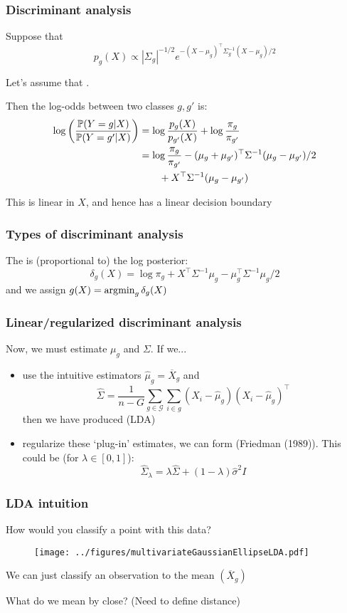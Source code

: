 \documentclass[12pt]{beamer}
\begin{document}
\begin{frame}
\frametitle{Discriminant analysis}
Suppose that
\[
p_g(X) \propto |\Sigma_g|^{-1/2} e^{-(X - \mu_g)^{\top}\Sigma_g^{-1}(X - \mu_g)/2}
\]

Let's assume that . 
\vsp

Then the log-odds between two classes $g,g'$ is:
\begin{align*}
\log\left( \frac{\P(Y = g | X)}{\P(Y = g' | X) } \right)
&  = 
\log\frac{p_g(X)}{p_{g'}(X)} + \log \frac{\pi_g}{\pi_{g'}}\\
& = 
\log \frac{\pi_g}{\pi_{g'}} - (\mu_{g} + \mu_{g'})^{\top} \Sigma^{-1} (\mu_g - \mu_{g'})/2  \\
& \qquad+ X^{\top} \Sigma^{-1}(\mu_g - \mu_{g'})
\end{align*}

This is linear in $X$, and hence has a linear decision boundary
\end{frame}

\begin{frame}
\frametitle{Types of discriminant analysis}
The  is (proportional to) the log posterior:
\[
\delta_g(X) = \log \pi_g + X^{\top} \Sigma^{-1}\mu_g  - \mu_{g}^{\top} \Sigma^{-1} \mu_g /2 
\]
and we assign $g(X) = \argmin_g \delta_g(X)$

\end{frame}


\begin{frame}
\frametitle{Linear/regularized discriminant analysis}

Now, we must estimate $\mu_g$ and $\Sigma$.  If we...
\begin{itemize}
\item use the intuitive estimators $\hat{\mu}_g = \overline{X}_g$ and 
\[
\hat\Sigma = \frac{1}{n-G} \sum_{g \in \mathcal{G}} \sum_{i \in g} (X_i - \hat{\mu}_g) (X_i - \hat{\mu}_g)^{\top}
\]
 then we have produced  (LDA)
\item regularize these `plug-in' estimates, we can form 
(Friedman (1989)).  This could be (for $\lambda \in [0,1]$):
\[
\hat{\Sigma}_{\lambda} = \lambda \hat{\Sigma} + (1-\lambda) \hat\sigma^2 I
\]
\end{itemize}
\end{frame}

\begin{frame}[fragile]
\frametitle{LDA intuition}
How would you  classify a point with this data?
\begin{figure}
\centering
\texttt{[image: ../figures/multivariateGaussianEllipseLDA.pdf]}
\end{figure}

\vsp
We can just classify an observation to the  mean $(\overline{X}_g)$

\vsp
What do we mean by close? (Need to define distance)
\end{frame}
\end{document}
